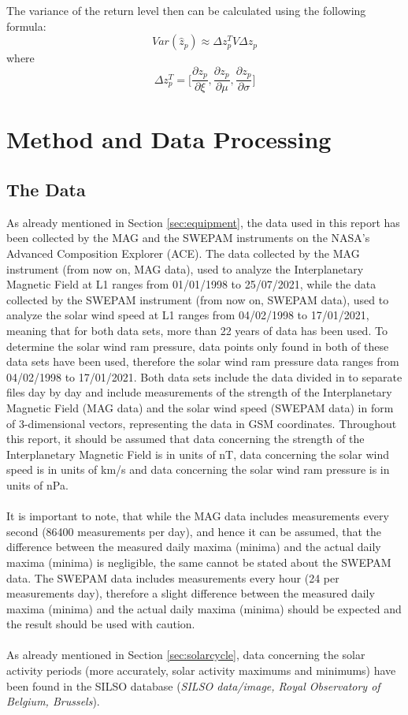 \documentclass[12pt]{article}
\begin{document}
        The variance of the return level then can be calculated using the following formula:
        \begin{equation}
            Var(\hat z_p)\approx \Delta z_p^TV\Delta z_p
        \end{equation}
        where
        \begin{equation}
            \Delta z_p^T=\Bigg [\frac{\partial z_p}{\partial \xi}, \frac{\partial z_p}{\partial \mu}, \frac{\partial z_p}{\partial \sigma}\Bigg ]
        \end{equation}
\section{Method and Data Processing}\label{sec:method}
    \subsection{The Data}\label{sec:data}
        As already mentioned in Section \ref{sec:equipment}, the data used in this report has been collected by the MAG\cite{1998acemag} and the SWEPAM\cite{1998aceswepam} instruments on the NASA's Advanced Composition Explorer (ACE)\cite{1998ace}. The data collected by the MAG instrument (from now on, MAG data), used to analyze the Interplanetary Magnetic Field at L1 ranges from 01/01/1998 to 25/07/2021, while the data collected by the SWEPAM instrument (from now on, SWEPAM data), used to analyze the solar wind speed at L1 ranges from 04/02/1998 to 17/01/2021, meaning that for both data sets, more than 22 years of data has been used. To determine the solar wind ram pressure, data points only found in both of these data sets have been used, therefore the solar wind ram pressure data ranges from 04/02/1998 to 17/01/2021. Both data sets include the data divided in to separate files day by day and include measurements of the strength of the Interplanetary Magnetic Field (MAG data) and the solar wind speed (SWEPAM data) in form of 3-dimensional vectors, representing the data in GSM coordinates. Throughout this report, it should be assumed that data concerning the strength of the Interplanetary Magnetic Field is in units of nT, data concerning the solar wind speed is in units of km/s and data concerning the solar wind ram pressure is in units of nPa.\\ \\
        It is important to note, that while the MAG data includes measurements every second (86400 measurements per day), and hence it can be assumed, that the difference between the measured daily maxima (minima) and the actual daily maxima (minima) is negligible, the same cannot be stated about the SWEPAM data. The SWEPAM data includes measurements every hour (24 per measurements day), therefore a slight difference between the measured daily maxima (minima) and the actual daily maxima (minima) should be expected and the result should be used with caution.\\ \\
        As already mentioned in Section \ref{sec:solarcycle}, data concerning the solar activity periods (more accurately, solar activity maximums and minimums) have been found in the SILSO database (\textit{SILSO data/image, Royal Observatory of Belgium, Brussels}).
\end{document}
